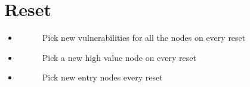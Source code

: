 \documentclass[letterpaper,10pt,english]{sphinxmanual}
\begin{document}
\section{Reset}
\label{\detokenize{source/config_file:reset}}\begin{itemize}
\item {} \begin{description}
\item[{}] \leavevmode
\sphinxAtStartPar
Pick new vulnerabilities for all the nodes on every reset

\end{description}

\item {} \begin{description}
\item[{}] \leavevmode
\sphinxAtStartPar
Pick a new high value node on every reset

\end{description}

\item {} \begin{description}
\item[{}] \leavevmode
\sphinxAtStartPar
Pick new entry nodes every reset

\end{description}

\end{itemize}
\end{document}
